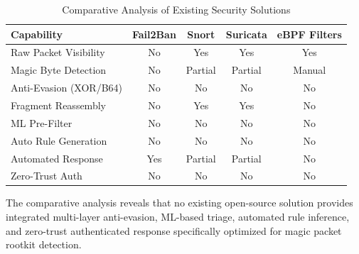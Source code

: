 \begin{table}[h]
\centering
\caption{Comparative Analysis of Existing Security Solutions}
\label{tab:existing_solutions}
\begin{tabular}{|p{2.5cm}|c|c|c|c|}
\hline
\textbf{Capability} & \textbf{Fail2Ban} & \textbf{Snort} & \textbf{Suricata} & \textbf{eBPF Filters} \\
\hline
Raw Packet Visibility & No & Yes & Yes & Yes \\
\hline
Magic Byte Detection & No & Partial & Partial & Manual \\
\hline
Anti-Evasion (XOR/B64) & No & No & No & No \\
\hline
Fragment Reassembly & No & Yes & Yes & No \\
\hline
ML Pre-Filter & No & No & No & No \\
\hline
Auto Rule Generation & No & No & No & No \\
\hline
Automated Response & Yes & Partial & Partial & No \\
\hline
Zero-Trust Auth & No & No & No & No \\
\hline
\end{tabular}
\end{table}

The comparative analysis reveals that no existing open-source solution provides integrated multi-layer anti-evasion, ML-based triage, automated rule inference, and zero-trust authenticated response specifically optimized for magic packet rootkit detection.
